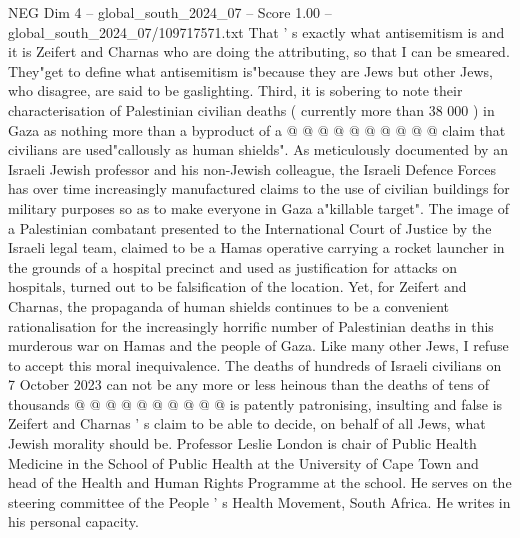 \begin{textsample}{NEG Dim 4 – global\_south\_2024\_07 – Score 1.00 – global\_south\_2024\_07/109717571.txt}
That ' s exactly what antisemitism is and it is Zeifert and Charnas who are doing the attributing, so that I can be smeared.
They"get to define what antisemitism is"because they are Jews but other Jews, who disagree, are said to be gaslighting.
Third, it is sobering to note their characterisation of Palestinian civilian deaths ( currently more than 38 000 ) in Gaza as nothing more than a byproduct of a @ @ @ @ @ @ @ @ @ @ claim that civilians are used"callously as human shields".
As meticulously documented by an Israeli Jewish professor and his non-Jewish colleague, the Israeli Defence Forces has over time increasingly manufactured claims to the use of civilian buildings for military purposes so as to make everyone in Gaza a"killable target".
The image of a Palestinian combatant presented to the International Court of Justice by the Israeli legal team, claimed to be a Hamas operative carrying a rocket launcher in the grounds of a hospital precinct and used as justification for attacks on hospitals, turned out to be falsification of the location.
Yet, for Zeifert and Charnas, the propaganda of human shields continues to be a convenient rationalisation for the increasingly horrific number of Palestinian deaths in this murderous war on Hamas and the people of Gaza.
Like many other Jews, I refuse to accept this moral inequivalence.
The deaths of hundreds of Israeli civilians on 7 October 2023 can not be any more or less heinous than the deaths of tens of thousands @ @ @ @ @ @ @ @ @ @ is patently patronising, insulting and false is Zeifert and Charnas ' s claim to be able to decide, on behalf of all Jews, what Jewish morality should be.
Professor Leslie London is chair of Public Health Medicine in the School of Public Health at the University of Cape Town and head of the Health and Human Rights Programme at the school.
He serves on the steering committee of the People ' s Health Movement, South Africa.
He writes in his personal capacity.

\end{textsample}
